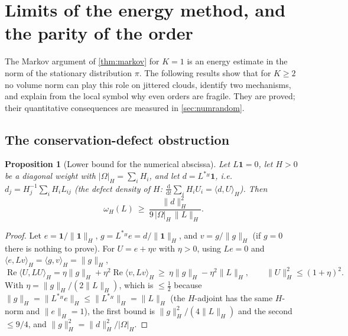 \documentclass[11pt,a4paper]{article}
\theoremstyle{plain}
\newtheorem{proposition}[theorem]{Proposition}
\theoremstyle{definition}
\theoremstyle{remark}
\numberwithin{equation}{section}
\newcommand{\dd}{\mathrm{d}}
\renewcommand{\Re}{\operatorname{Re}}
\begin{document}
\section{Limits of the energy method, and the parity of the order}\label{sec:limits}

The Markov argument of \cref{thm:markov} for $K=1$ is an energy estimate in the norm of the stationary distribution $\pi$. The following results show that for $K\ge2$ no volume norm can play this role on jittered clouds, identify two mechanisms, and explain from the local symbol why even orders are fragile. They are proved; their quantitative consequences are measured in \cref{sec:numrandom}.

\subsection{The conservation-defect obstruction}

\begin{proposition}[Lower bound for the numerical abscissa]\label{prop:obstruction}
Let $L\mathbf 1=0$, let $H>0$ be a diagonal weight with $|\Omega|_H=\sum_iH_i$, and let $d=L^{*_H}\mathbf 1$, i.e.\ $d_j=H_j^{-1}\sum_iH_iL_{ij}$ (the defect density of $H$: $\frac{\dd}{\dd t}\sum_iH_iU_i=\langle d,U\rangle_H$). Then
\begin{equation}\label{eq:obstruction}
\omega_H(L)\ \ge\ \frac{\|d\|_H^2}{9\,|\Omega|_H\,\|L\|_H}.
\end{equation}
\end{proposition}

\begin{proof}
Let $e=\mathbf 1/\|\mathbf 1\|_H$, $g=L^{*_H}e=d/\|\mathbf 1\|_H$, and $v=g/\|g\|_H$ (if $g=0$ there is nothing to prove). For $U=e+\eta v$ with $\eta>0$, using $Le=0$ and $\langle e,Lv\rangle_H=\langle g,v\rangle_H=\|g\|_H$,
\[
\Re\langle U,LU\rangle_H=\eta\|g\|_H+\eta^2\Re\langle v,Lv\rangle_H\ \ge\ \eta\|g\|_H-\eta^2\|L\|_H,\qquad \|U\|_H^2\le(1+\eta)^2 .
\]
With $\eta=\|g\|_H/(2\|L\|_H)$, which is $\le\tfrac12$ because $\|g\|_H=\|L^{*_H}e\|_H\le\|L^{*_H}\|_H=\|L\|_H$ (the $H$-adjoint has the same $H$-norm and $\|e\|_H=1$), the first bound is $\|g\|_H^2/(4\|L\|_H)$ and the second $\le9/4$, and $\|g\|^2_H=\|d\|_H^2/|\Omega|_H$.
\end{proof}
\end{document}
